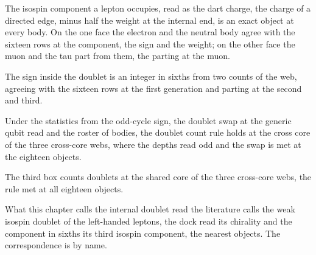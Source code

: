 \begin{chwall}\label{box:VI-3-doublets-handedness-and-parity-violation:2}
The isospin component a lepton occupies, read as the dart charge, the charge of a directed edge, minus half the weight at the internal end, is an exact object at every body. On the one face the electron and the neutral body agree with the sixteen rows at the component, the sign and the weight; on the other face the muon and the tau part from them, the parting at the muon.
\end{chwall}
The sign inside the doublet is an integer in sixths from two counts of the web, agreeing with the sixteen rows at the first generation and parting at the second and third.
\begin{chconditional}\label{box:VI-3-doublets-handedness-and-parity-violation:3}
Under the statistics from the odd-cycle sign, the doublet swap at the generic qubit read and the roster of bodies, the doublet count rule holds at the cross core of the three cross-core webs, where the depths read odd and the swap is met at the eighteen objects.
\end{chconditional}
The third box counts doublets at the shared core of the three cross-core webs, the rule met at all eighteen objects.
\begin{chbridge}
What this chapter calls the internal doublet read the literature calls the weak isospin doublet of the left-handed leptons, the dock read its chirality and the component in sixths its third isospin component, the nearest objects. The correspondence is by name.
\end{chbridge}

